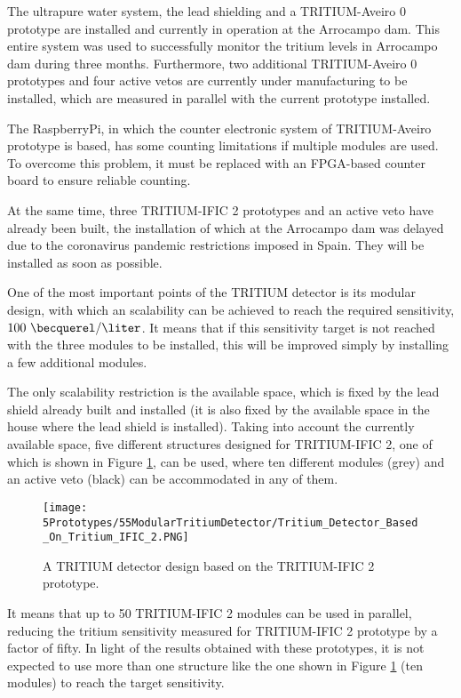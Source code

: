 The ultrapure water system, the lead shielding and a TRITIUM-Aveiro 0 prototype are installed and currently in operation at the Arrocampo dam. This entire system was used to successfully monitor the tritium levels in Arrocampo dam during three months. Furthermore, two additional TRITIUM-Aveiro 0 prototypes and four active vetos are currently under manufacturing to be installed, which are measured in parallel with the current prototype installed.

The RaspberryPi, in which the counter electronic system of TRITIUM-Aveiro prototype is based, has some counting limitations if multiple modules are used. To overcome this problem, it must be replaced with an FPGA-based counter board to ensure reliable counting.

At the same time, three TRITIUM-IFIC 2 prototypes and an active veto have already been built, the installation of which at the Arrocampo dam was delayed due to the coronavirus pandemic restrictions imposed in Spain. They will be installed as soon as possible.

One of the most important points of the TRITIUM detector is its modular design, with which an scalability can be achieved to reach the required sensitivity, $100~\becquerel/\liter$.  It means that if this sensitivity target is not reached with the three modules to be installed, this will be improved simply by installing a few additional modules.

The only scalability restriction is the available space, which is fixed by the lead shield already built and installed (it is also fixed by the available space in the house where the lead shield is installed). Taking into account the currently available space, five different structures designed for TRITIUM-IFIC 2, one of which is shown in Figure \ref{fig:TritiumMonitorIFIC2Design}, can be used, where ten different modules (grey) and an active veto (black) can be accommodated in any of them. 

\begin{figure}[h]
\centering
\texttt{[image: 5Prototypes/55ModularTritiumDetector/Tritium\_Detector\_Based\_On\_Tritium\_IFIC\_2.PNG]}
\caption{A TRITIUM detector design based on the TRITIUM-IFIC 2 prototype.\label{fig:TritiumMonitorIFIC2Design}}
\end{figure}

It means that up to 50 TRITIUM-IFIC 2 modules can be used in parallel, reducing the tritium sensitivity measured for TRITIUM-IFIC 2 prototype by a factor of fifty. In light of the results obtained with these prototypes, it is not expected to use more than one structure like the one shown in Figure \ref{fig:TritiumMonitorIFIC2Design} (ten modules) to reach the target sensitivity.